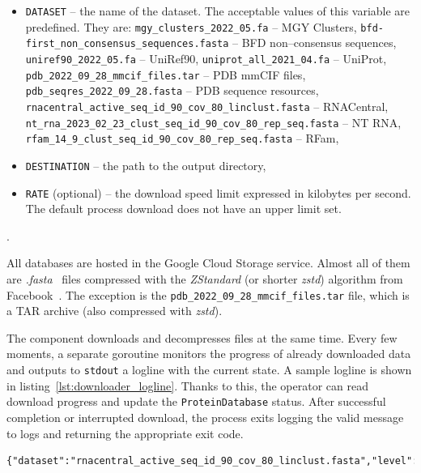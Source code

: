 \begin{itemize}
    \item \texttt{DATASET} -- the name of the dataset.
    The acceptable values of this variable are predefined.
    They are:
    \subitem \texttt{mgy\_clusters\_2022\_05.fa} -- MGY Clusters,
    \subitem \texttt{bfd-first\_non\_consensus\_sequences.fasta} -- BFD non--consensus sequences,
    \subitem \texttt{uniref90\_2022\_05.fa} -- UniRef90,
    \subitem \texttt{uniprot\_all\_2021\_04.fa} -- UniProt,
    \subitem \texttt{pdb\_2022\_09\_28\_mmcif\_files.tar} -- PDB mmCIF files,
    \subitem \texttt{pdb\_seqres\_2022\_09\_28.fasta} -- PDB sequence resources,
    \subitem \texttt{rnacentral\_active\_seq\_id\_90\_cov\_80\_linclust.fasta} -- RNACentral,
    \subitem \texttt{nt\_rna\_2023\_02\_23\_clust\_seq\_id\_90\_cov\_80\_rep\_seq.fasta} -- NT RNA,
    \subitem \texttt{rfam\_14\_9\_clust\_seq\_id\_90\_cov\_80\_rep\_seq.fasta} -- RFam,
    \item \texttt{DESTINATION} -- the path to the output directory,
    \item \texttt{RATE} (optional) -- the download speed limit expressed in kilobytes per second.
    The default process download does not have an upper limit set.
\end{itemize}.

All databases are hosted in the Google Cloud Storage service.
Almost all of them are \textit{.fasta}~\cite{pearson1988fasta} files compressed with the \textit{ZStandard} (or shorter \textit{zstd}) algorithm from Facebook~\cite{zstandard}.
The exception is the \texttt{pdb\_2022\_09\_28\_mmcif\_files.tar} file, which is a TAR archive (also compressed with \textit{zstd}).

The component downloads and decompresses files at the same time.
Every few moments, a separate goroutine monitors the progress of already downloaded data and outputs to \texttt{stdout} a logline with the current state.
A sample logline is shown in listing~\ref{lst:downloader_logline}.
Thanks to this, the operator can read download progress and update the \texttt{ProteinDatabase} status.
After successful completion or interrupted download, the process exits logging the valid message to logs and returning the appropriate exit code.

\begin{lstlisting}[language=txt,caption={Sample logline from downloader},label={lst:downloader_logline}]
{"dataset":"rnacentral_active_seq_id_90_cov_80_linclust.fasta","level":"info","msg":"Download progress","size":7700349721,"time":"2025-05-17T16:53:52+02:00","total":13860314914,"type":"download","unit":"bytes"}
\end{lstlisting}

